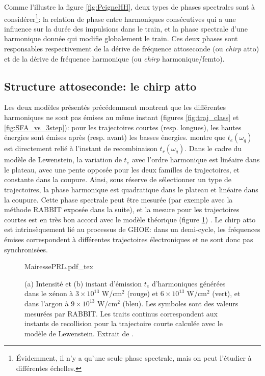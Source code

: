 Comme l'illustre la figure \ref{fig:PeigneHH}, deux types de phases spectrales sont à considérer\footnote{\'{E}videmment, il n'y a qu'une seule phase spectrale, mais on peut l'étudier à différentes échelles.}: la relation de phase entre harmoniques consécutives qui a une influence sur la durée des impulsions dans le train, et la phase spectrale d'une harmonique donnée qui modifie globalement le train. Ces deux phases sont responsables respectivement de la dérive de fréquence attoseconde (ou \textit{chirp} atto) et de la dérive de fréquence harmonique (ou \textit{chirp} harmonique/femto).

\subsection{Structure attoseconde: le chirp atto} 
\label{subsec:ChirpAtto}
Les deux modèles présentés précédemment montrent que les différentes harmoniques ne sont pas émises au même instant (figures \ref{fig:traj_class} et \ref{fig:SFA_vs_3step}): pour les trajectoires courtes (resp. longues), les hautes énergies sont émises après (resp. avant) les basses énergies.  montre que $t_e(\omega_q)$ est directement relié à l'instant de recombinaison $t_r(\omega_q)$. Dans le cadre du modèle de Lewenstein, la variation de $t_e$ avec l'ordre harmonique est linéaire dans le plateau, avec une pente opposée pour les deux familles de trajectoires, et constante dans la coupure. Ainsi, sous réserve de sélectionner un type de trajectoires, la phase harmonique est quadratique dans le plateau et linéaire dans la coupure. Cette phase spectrale peut être mesurée (par exemple avec la méthode RABBIT exposée dans la suite), et la mesure pour les trajectoires courtes est en très bon accord avec le modèle théorique (figure \ref{fig:MairessePRL}) . Le chirp atto est intrinsèquement lié au processus de GHOE: dans un demi-cycle, les fréquences émises correspondent à différentes trajectoires électroniques et ne sont donc pas synchronisées.  

\begin{figure}
\centering
\def\svgwidth{0.7\columnwidth}
{MairessePRL.pdf_tex}
\caption{(a) Intensité et (b) instant d'émission $t_e$ d'harmoniques générées dans le xénon à $3 \times 10^{13}$ W/cm$^2$ (rouge) et $6 \times 10^{13}$ W/cm$^2$ (vert), et dans l'argon à $9 \times 10^{13}$ W/cm$^2$ (bleu). Les symboles sont des valeurs mesurées par RABBIT. Les traits continus correspondent aux instants de recollision pour la trajectoire courte calculée avec le modèle de Lewenstein. Extrait de .}
\label{fig:MairessePRL}
\end{figure}

